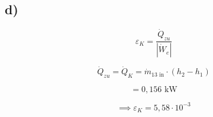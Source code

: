 

\subsection*{d)}
\[
\varepsilon_K = \frac{\dot{Q}_{zu}}{|\dot{W}_e|}
\]

\[
\dot{Q}_{zu} = \dot{Q}_K = \dot{m}_{13 \text{ in}} \cdot (h_2 - h_1)
\]

\[
= 0,156 \text{ kW}
\]

\[
\implies \varepsilon_K = 5,58 \cdot 10^{-3}
\]